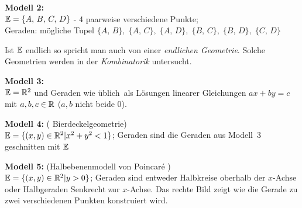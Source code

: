 {\bf Modell 2:}\\
$\mathbb E=\{A,\,B,\,C,\,D\}$ - 4 paarweise verschiedene Punkte;\\
Geraden: mögliche Tupel $\{A,\,B\},\;\{A,\,C\},\;\{A,\,D\},\;\{B,\,C\},\;\{B,\,D\},\;\{C,\,D\}$

Ist $\mathbb E$ endlich so spricht man auch von einer {\em endlichen Geometrie}.
Solche Geometrien werden in der {\em Kombinatorik} untersucht.


{\bf Modell 3:}\\$\mathbb E=\mathbb R^2$ und Geraden \glqq wie üblich\grqq\ als
Lösungen linearer Gleichungen $a x + b y = c$ mit $a,b,c\in \mathbb R$ ($a,b$
nicht beide $0$).

{\bf Modell 4:} ( \glqq Bierdeckelgeometrie\grqq )\\ %
$\mathbb E=\{ (x,y)\in\mathbb R^2 | x^2+y^2<1 \}$;
Geraden sind die Geraden aus Modell~3 geschnitten mit $\mathbb E$

\begin{center}
	
\end{center}


\bigskip


{\bf Modell 5:} (\glqq Halbebenenmodell von Poincar\'e \grqq )\\
$\mathbb E=\{ (x,y)\in\mathbb R^2 | y>0 \}$;
Geraden sind entweder Halbkreise oberhalb der $x$-Achse
oder Halbgeraden Senkrecht zur $x$-Achse. Das rechte Bild zeigt wie 
die Gerade zu zwei verschiedenen Punkten konstruiert wird. 


